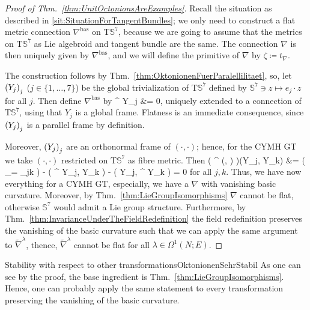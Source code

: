 \begin{proof}[Proof of Thm.~\ref{thm:UnitOctonionsAreExamples}]
\leavevmode\newline 
Recall the situation as described in \ref{sit:SituationForTangentBundles}; we only need to construct a flat metric connection $\nabla^{\mathrm{bas}}$ on $\mathrm{T}\mathds{S}^7$, because we are going to assume that the metrics on $\mathrm{T}\mathds{S}^7$ as Lie algebroid and tangent bundle are the same. The connection $\nabla$ is then uniquely given by $\nabla^{\mathrm{bas}}$, and we will define the primitive of $\nabla$ by $\zeta \coloneqq t_\nabla$.

The construction follows by Thm.~\ref{thm:OktonionenFuerParalellilitaet}, so, let $\mleft( Y_j \mright)_j$ ($j \in \{1, \dotsc, 7\}$) be the global trivialization of $\mathrm{T}\mathds{S}^7$ defined by $\mathds{S}^7 \ni z \mapsto e_j \cdot z$ for all $j$. Then define $\nabla^{\mathrm{bas}}$ by
\bas
\nabla^{} Y_j
&=
0,
\eas
uniquely extended to a connection of $\mathrm{T}\mathds{S}^7$, using that $Y_j$ is a global frame. Flatness is an immediate consequence, since $\mleft( Y_j \mright)_j$ is a parallel frame by definition.

Moreover, $\mleft( Y_j \mright)_j$ are an orthonormal frame of $(\cdot, \cdot)$; hence, for the CYMH GT we take $(\cdot, \cdot)$ restricted on $\mathrm{T}\mathds{S}^7$ as fibre metric. Then
\bas
\mleft( \nabla^{} (\cdot, \cdot) \mright)(Y_j, Y_k)
&=
\bigl( _{= \delta_{jk}} \bigr)
	- \mleft( \nabla^{} Y_j, Y_k \mright)
	- \mleft( Y_j, \nabla^{} Y_k \mright)
=
0
\eas
for all $j,k$. Thus, we have now everything for a CYMH GT, especially, we have a $\nabla$ with vanishing basic curvature. Moreover, by Thm.~\ref{thm:LieGroupIsomorphisms} $\nabla$ cannot be flat, otherwise $\mathds{S}^7$ would admit a Lie group structure. Furthermore, by Thm.~\ref{thm:InvarianceUnderTheFieldRedefinition} the field redefinition preserves the vanishing of the basic curvature such that we can apply the same argument to $\widetilde{\nabla}^\lambda$, thence, $\widetilde{\nabla}^\lambda$ cannot be flat for all $\lambda \in \Omega^1(N;E)$.
\end{proof}

\begin{remarks}{Stability with respect to other transformations}{OktonionenSehrStabil}
As one can see by the proof, the base ingredient is Thm.~\ref{thm:LieGroupIsomorphisms}. Hence, one can probably apply the same statement to every transformation preserving the vanishing of the basic curvature.
\end{remarks}

